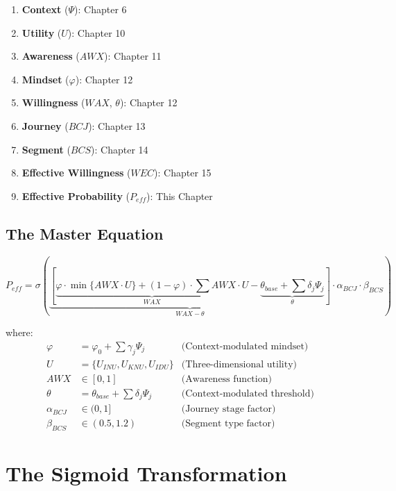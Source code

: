 \begin{enumerate}
    \item \textbf{Context} ($\Psi$): Chapter 6
    \item \textbf{Utility} ($U$): Chapter 10
    \item \textbf{Awareness} ($AWX$): Chapter 11
    \item \textbf{Mindset} ($\varphi$): Chapter 12
    \item \textbf{Willingness} ($WAX$, $\theta$): Chapter 12
    \item \textbf{Journey} ($BCJ$): Chapter 13
    \item \textbf{Segment} ($BCS$): Chapter 14
    \item \textbf{Effective Willingness} ($WEC$): Chapter 15
    \item \textbf{Effective Probability} ($P_{eff}$): This Chapter
\end{enumerate}

\subsection{The Master Equation}

\begin{equation}
P_{eff} = \sigma\left( 
    \underbrace{
        \left[
            \underbrace{\varphi \cdot \min\{AWX \cdot U\} + (1-\varphi) \cdot \sum AWX \cdot U}_{WAX}
            - \underbrace{\theta_{base} + \sum \delta_j \Psi_j}_{\theta}
        \right]
    }_{WAX - \theta}
    \cdot \alpha_{BCJ} \cdot \beta_{BCS}
\right)
\end{equation}

where:
\begin{align}
\varphi &= \varphi_0 + \sum \gamma_j \Psi_j & \text{(Context-modulated mindset)} \\
U &= \{U_{INU}, U_{KNU}, U_{IDU}\} & \text{(Three-dimensional utility)} \\
AWX &\in [0,1] & \text{(Awareness function)} \\
\theta &= \theta_{base} + \sum \delta_j \Psi_j & \text{(Context-modulated threshold)} \\
\alpha_{BCJ} &\in (0,1] & \text{(Journey stage factor)} \\
\beta_{BCS} &\in (0.5, 1.2) & \text{(Segment type factor)}
\end{align}

\section{The Sigmoid Transformation}

